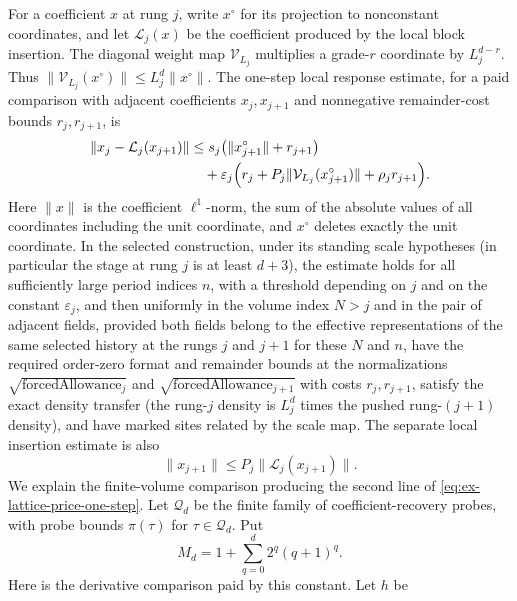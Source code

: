 For a coefficient \(x\) at rung \(j\), write \(x^{\circ}\) for its
projection to nonconstant coordinates, and let \(\mathcal L_j(x)\) be the
coefficient produced by the local block insertion. The diagonal weight map
\(\mathcal V_{L_j}\) multiplies a grade-\(r\) coordinate by
\(L_j^{d-r}\). Thus \(\|\mathcal V_{L_j}(x^{\circ})\|
\leq L_j^d\|x^{\circ}\|\).
The one-step local response estimate, for a paid comparison with adjacent coefficients
\(x_j,x_{j+1}\) and nonnegative remainder-cost bounds \(r_j,r_{j+1}\), is
\begin{equation}
 \begin{split}
 \|x_j-\mathcal L_j(x_{j+1})\|
 &\leq s_j\bigl(\|x_{j+1}^{\circ}\|+r_{j+1}\bigr)\\
 &\quad+\varepsilon_j\Bigl(r_j+P_j\|\mathcal V_{L_j}
                (x_{j+1}^{\circ})\|+\rho_jr_{j+1}\Bigr).
 \end{split}
 \label{eq:ex-lattice-price-one-step}
\end{equation}
Here \(\|x\|\) is the coefficient \(\ell^1\)-norm, the sum of the absolute
values of all coordinates including the unit coordinate, and \(x^\circ\)
deletes exactly the unit coordinate. In the selected construction, under
its standing scale hypotheses (in particular the stage at rung \(j\) is at
least \(d+3\)), the estimate
holds for all sufficiently large period indices \(n\), with a threshold
depending on \(j\) and on the constant \(\varepsilon_j\), and then uniformly
in the volume index \(N>j\) and in the pair of adjacent fields, provided
both fields belong to the effective representations of the same selected
history at the rungs \(j\) and \(j+1\) for these \(N\) and \(n\), have the
required order-zero format and remainder bounds at the normalizations
\(\sqrt{\operatorname{forcedAllowance}_j}\) and
\(\sqrt{\operatorname{forcedAllowance}_{j+1}}\) with costs
\(r_j,r_{j+1}\), satisfy the exact density transfer (the rung-\(j\) density
is \(L_j^d\) times the pushed rung-\((j+1)\) density), and have marked
sites related by the scale map. The separate
local insertion estimate is also
\begin{equation}
 \|x_{j+1}\|\leq P_j\|\mathcal L_j(x_{j+1})\|.
 \label{eq:ex-lattice-price-spends}
\end{equation}
We explain the finite-volume comparison producing the second line of
\eqref{eq:ex-lattice-price-one-step}. Let \(\mathcal Q_d\) be the finite
family of coefficient-recovery probes, with probe bounds \(\pi(\tau)\) for \(\tau\in\mathcal Q_d\). Put
\[
 M_d=1+\sum_{q=0}^{d}2^q(q+1)^q .
\]
Here is the derivative comparison paid by this constant. Let $h$ be
